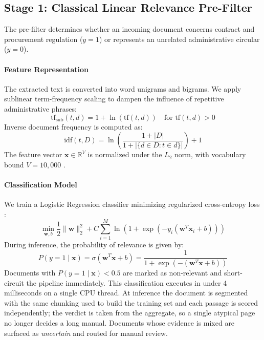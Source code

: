 \documentclass{article}
\begin{document}
\subsection{Stage 1: Classical Linear Relevance Pre-Filter}
The pre-filter determines whether an incoming document concerns contract and procurement regulation ($y = 1$) or represents an unrelated administrative circular ($y = 0$).

\paragraph{Feature Representation}
The extracted text is converted into word unigrams and bigrams. We apply sublinear term-frequency scaling to dampen the influence of repetitive administrative phrases:
\begin{equation}
    \text{tf}_{\text{sub}}(t, d) = 1 + \ln(\text{tf}(t, d)) \quad \text{for } \text{tf}(t, d) > 0
\end{equation}
Inverse document frequency is computed as:
\begin{equation}
    \text{idf}(t, D) = \ln \left( \frac{1 + |D|}{1 + |\{d \in D : t \in d\}|} \right) + 1
\end{equation}
The feature vector $\mathbf{x} \in \mathbb{R}^{V}$ is normalized under the $L_2$ norm, with vocabulary bound $V = 10{,}000$ \citep{salton1988term}.

\paragraph{Classification Model}
We train a Logistic Regression classifier minimizing regularized cross-entropy loss \citep{pedregosa2011scikit}:
\begin{equation}
    \min_{\mathbf{w}, b} \frac{1}{2} \|\mathbf{w}\|_2^2 + C \sum_{i=1}^{M} \ln(1 + \exp(-y_i (\mathbf{w}^T \mathbf{x}_i + b)))
\end{equation}
During inference, the probability of relevance is given by:
\begin{equation}
    P(y = 1 \mid \mathbf{x}) = \sigma(\mathbf{w}^T \mathbf{x} + b) = \frac{1}{1 + \exp(-(\mathbf{w}^T \mathbf{x} + b))}
\end{equation}
Documents with $P(y = 1 \mid \mathbf{x}) < 0.5$ are marked as non-relevant and short-circuit the pipeline immediately. This classification executes in under 4 milliseconds on a single CPU thread. At inference the document is segmented with the same chunking used to build the training set and each passage is scored independently; the verdict is taken from the aggregate, so a single atypical page no longer decides a long manual. Documents whose evidence is mixed are surfaced as \emph{uncertain} and routed for manual review.
\end{document}
